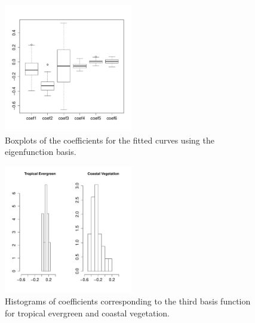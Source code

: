 \begin{figure}[htbp] %
   \centering
   \includegraphics[width=0.5\textwidth]{Images-future-work/boxplot-coefs.pdf} 
   \caption{Boxplots of the coefficients for the fitted curves using the eigenfunction basis.  }
   \label{fig:coef boxplot}
\end{figure}

\begin{figure}[htbp] %
   \centering
   \includegraphics[width=0.5\textwidth]{Images-future-work/hist-trpEvgrn-CstVeg-coef3.pdf} 
   \caption{Histograms of coefficients corresponding to the third basis function for tropical evergreen and coastal vegetation.  }
   \label{fig:histogram coefs}
\end{figure}


